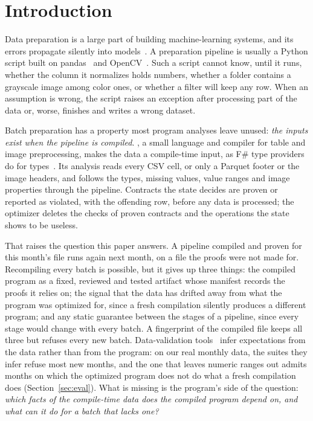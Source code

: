 
\section{Introduction}

Data preparation is a large part of building machine-learning systems, and its errors propagate
silently into models~\cite{sculley2015,polyzotis2018}. A preparation pipeline is usually a Python
script built on pandas~\cite{mckinney2010} and OpenCV~\cite{bradski2000}. Such a script cannot know,
until it runs, whether the column it normalizes holds numbers, whether a folder contains a grayscale
image among color ones, or whether a filter will keep any row. When an assumption is wrong, the
script raises an exception after processing part of the data or, worse, finishes and writes a
wrong dataset.

Batch preparation has a property most program analyses leave unused: \emph{the inputs exist when
the pipeline is compiled}. \PL, a small language and compiler for table and image preprocessing,
makes the data a compile-time input, as F\# type providers do for types~\cite{petricek2016}. Its
analysis reads every CSV cell, or only a Parquet footer or the image headers, and follows the types,
missing values, value ranges and image properties through the pipeline. Contracts the state decides
are proven or reported as violated, with the offending row, before any data is processed; the
optimizer deletes the checks of proven contracts and the operations the state shows to be useless.

That raises the question this paper answers. A pipeline compiled and proven for this month's file
runs again next month, on a file the proofs were not made for. Recompiling every batch is possible,
but it gives up three things: the compiled program as a fixed, reviewed and tested artifact whose
manifest records the proofs it relies on; the signal that the data has drifted away from what the
program was optimized for, since a fresh compilation silently produces a different program; and any
static guarantee between the stages of a pipeline, since every stage would change with every batch.
A fingerprint of the compiled file keeps all three but refuses every new batch.
Data-validation tools~\cite{breck2019,schelter2018,bantilan2020,gx} infer expectations from the data
rather than from the program: on our real monthly data, the suites they infer refuse most new
months, and the one that leaves numeric ranges out admits months on which the optimized program
does not do what a fresh compilation does (Section~\ref{sec:eval}). What is missing is the program's side of the question:
\emph{which facts of the compile-time data does the compiled program depend on, and what can it do
for a batch that lacks one?}

